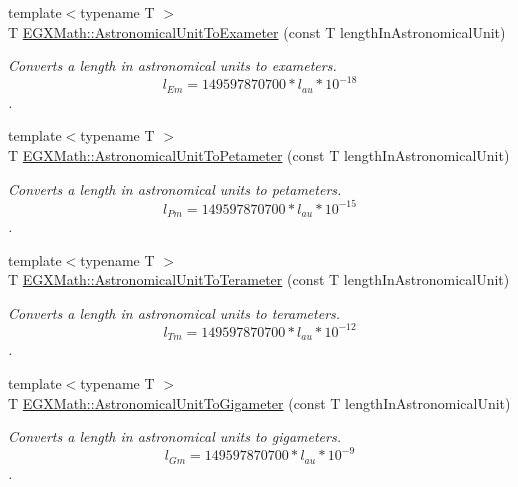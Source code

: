 \begin{DoxyCompactItemize}
{\footnotesize template$<$typename T $>$ }\\T \mbox{\hyperlink{group___e_g_x_math-_conversions-_length_conversions-_astronomical-_astronomical_unit-_s_i_ga393f3407128b5b84500a5c16796ebed4}{E\+G\+X\+Math\+::\+Astronomical\+Unit\+To\+Exameter}} (const T length\+In\+Astronomical\+Unit)
\begin{DoxyCompactList}\small\item\em Converts a length in astronomical units to exameters. \[ l_{Em}=149597870700 * l_{au} * 10^{-18} \]. \end{DoxyCompactList}\item 
{\footnotesize template$<$typename T $>$ }\\T \mbox{\hyperlink{group___e_g_x_math-_conversions-_length_conversions-_astronomical-_astronomical_unit-_s_i_gad8745fa5ccc5e8170717b4fd70c66623}{E\+G\+X\+Math\+::\+Astronomical\+Unit\+To\+Petameter}} (const T length\+In\+Astronomical\+Unit)
\begin{DoxyCompactList}\small\item\em Converts a length in astronomical units to petameters. \[ l_{Pm}=149597870700 * l_{au} * 10^{-15} \]. \end{DoxyCompactList}\item 
{\footnotesize template$<$typename T $>$ }\\T \mbox{\hyperlink{group___e_g_x_math-_conversions-_length_conversions-_astronomical-_astronomical_unit-_s_i_gac398353ade6e245157c1aa623792f1e3}{E\+G\+X\+Math\+::\+Astronomical\+Unit\+To\+Terameter}} (const T length\+In\+Astronomical\+Unit)
\begin{DoxyCompactList}\small\item\em Converts a length in astronomical units to terameters. \[ l_{Tm}=149597870700 * l_{au} * 10^{-12} \]. \end{DoxyCompactList}\item 
{\footnotesize template$<$typename T $>$ }\\T \mbox{\hyperlink{group___e_g_x_math-_conversions-_length_conversions-_astronomical-_astronomical_unit-_s_i_ga8f063e63221d46cfb027d43bf3a03aa3}{E\+G\+X\+Math\+::\+Astronomical\+Unit\+To\+Gigameter}} (const T length\+In\+Astronomical\+Unit)
\begin{DoxyCompactList}\small\item\em Converts a length in astronomical units to gigameters. \[ l_{Gm}=149597870700 * l_{au} * 10^{-9} \]. \end{DoxyCompactList}\item 

\end{DoxyCompactItemize}
